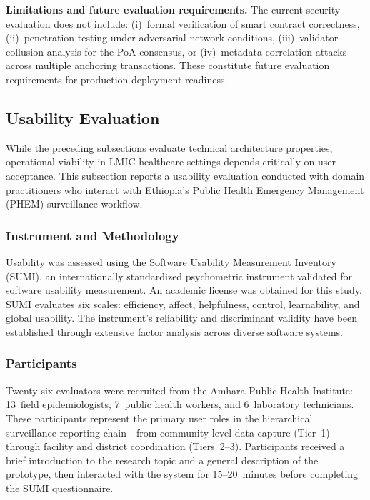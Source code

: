 \textbf{Limitations and future evaluation requirements.} The current security evaluation does not include: (i)~formal verification of smart contract correctness, (ii)~penetration testing under adversarial network conditions, (iii)~validator collusion analysis for the PoA consensus, or (iv)~metadata correlation attacks across multiple anchoring transactions. These constitute future evaluation requirements for production deployment readiness.

\subsection{Usability Evaluation}\label{subsec:usability}

While the preceding subsections evaluate technical architecture properties, operational viability in LMIC healthcare settings depends critically on user acceptance. This subsection reports a usability evaluation conducted with domain practitioners who interact with Ethiopia's Public Health Emergency Management (PHEM) surveillance workflow.

\subsubsection{Instrument and Methodology}

Usability was assessed using the Software Usability Measurement Inventory (SUMI), an internationally standardized psychometric instrument validated for software usability measurement. An academic license was obtained for this study. SUMI evaluates six scales: efficiency, affect, helpfulness, control, learnability, and global usability. The instrument's reliability and discriminant validity have been established through extensive factor analysis across diverse software systems.\cite{bevan1995measuring}

\subsubsection{Participants}

Twenty-six evaluators were recruited from the Amhara Public Health Institute: 13~field epidemiologists, 7~public health workers, and 6~laboratory technicians. These participants represent the primary user roles in the hierarchical surveillance reporting chain---from community-level data capture (Tier~1) through facility and district coordination (Tiers~2--3). Participants received a brief introduction to the research topic and a general description of the prototype, then interacted with the system for 15--20~minutes before completing the SUMI questionnaire.

